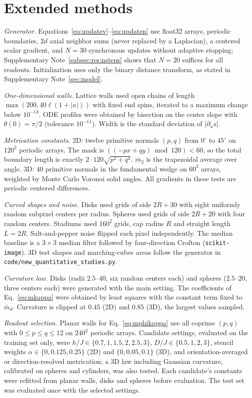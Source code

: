 \documentclass[11pt,a4paper]{article}
\begin{document}
\section{Extended methods}\label{sec:methods}
\emph{Generator.} Equations~\eqref{eq:updatev}--\eqref{eq:updaten} use float32 arrays, periodic boundaries, $2d$ axial neighbor sums (never replaced by a Laplacian), a centered scalar gradient, and $N=30$ synchronous updates without adaptive stopping; Supplementary Note~\ref{subsec:res:nsteps} shows that $N=20$ suffices for all readouts. Initialization uses only the binary distance transform, as stated in Supplementary Note~\ref{sec:model}.

\emph{One-dimensional walls.} Lattice walls used open chains of length $\max(200,40\ell(1+|\kappa|))$ with fixed end spins, iterated to a maximum change below $10^{-13}$. ODE profiles were obtained by bisection on the center slope with $\theta(0)=\pi/2$ (tolerance $10^{-11}$). Width is the standard deviation of $|\partial_us|$.

\emph{Metrication constants.} 2D: twelve primitive normals $(p,q)$ from $0^\circ$ to $45^\circ$ on $120^2$ periodic arrays. The mask is $((-px+qy)\bmod 120)<60$, so the total boundary length is exactly $2\cdot120\sqrt{p^2+q^2}$. $\bar m_2$ is the trapezoidal average over angle. 3D: 40 primitive normals in the fundamental wedge on $60^3$ arrays, weighted by Monte Carlo Voronoi solid angles. All gradients in these tests are periodic centered differences.

\emph{Curved shapes and noise.} Disks used grids of side $2R+30$ with eight uniformly random subpixel centers per radius. Spheres used grids of side $2R+20$ with four random centers. Stadiums used $160^2$ grids, cap radius $R$ and straight length $L=2R$. Salt-and-pepper noise flipped each pixel independently. The median baseline is a $3\times3$ median filter followed by four-direction Crofton (\texttt{scikit-image}). 3D test shapes and marching-cubes areas follow the generator in \texttt{code/new\_quantitative\_studies.py}.

\emph{Curvature law.} Disks (radii $2.5$--$40$, six random centers each) and spheres ($2.5$--$20$, three centers each) were generated with the main setting. The coefficients of Eq.~\eqref{eq:mkappa} were obtained by least squares with the constant term fixed to $\bar m_d$. Curvature is clipped at $0.45$ (2D) and $0.85$ (3D), the largest values sampled.

\emph{Readout selection.} Planar walls for Eq.~\eqref{eq:mphikappa} use all coprime $(p,q)$ with $0\le p\le q\le12$ on $240^2$ periodic arrays. Candidate settings, evaluated on the training set only, were $h/J\in\{0.7,1,1.5,2,2.5,3\}$, $D/J\in\{0.5,1,2,3\}$, stencil weights $\alpha\in\{0,0.125,0.25\}$ (2D) and $\{0,0.05,0.1\}$ (3D), and orientation-averaged or direction-resolved metrication; a 3D law including Gaussian curvature, calibrated on spheres and cylinders, was also tested. Each candidate's constants were refitted from planar walls, disks and spheres before evaluation. The test set was evaluated once with the selected settings.
\end{document}

